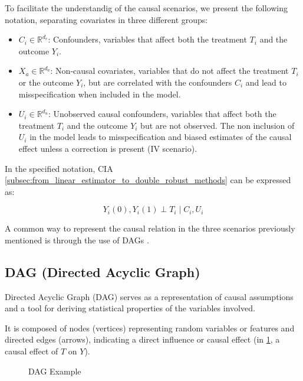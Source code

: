 \documentclass{article}
\numberwithin{equation}{section}
\begin{document}
To facilitate the understandig of the causal scenarios, we present the following notation, separating covariates in three different groups:
\begin{itemize}
    \item $C_i \in \mathbb{R}^{d_c}$: Confounders, variables that affect both the treatment $T_i$ and the outcome $Y_i$.
    \item $X_a \in \mathbb{R}^{d_a}$: Non-causal covariates, variables that do not affect the treatment $T_i$ or the outcome $Y_i$, but are correlated with the confounders $C_i$ and lead to misspecification when included in the model.
    \item $U_i \in \mathbb{R}^{d_u}$: Unobserved causal confounders, variables that affect both the treatment $T_i$ and the outcome $Y_i$ but are not observed. The non inclusion of $U_i$ in the model leads to misspecification and biased estimates of the causal effect unless a correction is present (IV scenario).
\end{itemize}

In the specified notation, CIA \eqref{subsec:from_linear_estimator_to_double_robust_methods} can be expressed as:

\begin{equation}
    Y_i(0), Y_i(1) \perp T_i \mid C_i, U_i
\end{equation}

A common way to represent the causal relation in the three scenarios previously mentioned is through the use of DAGs \cite{Pearl1995}.

\subsection{DAG (Directed Acyclic Graph)}

Directed Acyclic Graph (DAG) serves as a representation of causal assumptions and a tool for deriving statistical properties of the variables involved.

It is composed of nodes (vertices) representing random variables or features and directed edges (arrows), indicating a direct influence or causal effect (in \ref{fig:dag_example}, a causal effect of $T$ on $Y$).

\begin{figure}[H]
    \centering
    \caption{DAG Example}
    \label{fig:dag_example}
\end{figure}
\end{document}
